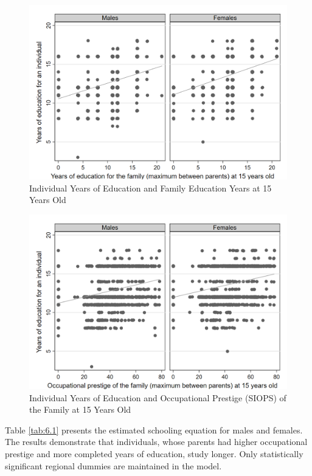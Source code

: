 \documentclass[alpha-refs]{wiley-article-01g}
\begin{document}
\begin{figure}[h!]
	\centering
	\includegraphics[width=\textwidth]{fam_edu_schooling.png}
	\caption{Individual Years of Education and Family Education Years at 15 Years Old}\label{fig:6.1}
\end{figure}

\begin{figure}[h!]
	\centering
	\includegraphics[width=\textwidth]{fam_prestige_schooling.png}
	\caption{Individual Years of Education and Occupational Prestige (SIOPS) of the Family at 15 Years Old}\label{fig:6.2}
\end{figure}

Table \ref{tab:6.1} presents the estimated schooling equation for males and 
females. The results demonstrate that individuals, whose parents had higher 
occupational prestige and more completed years of education, study longer. 
Only statistically significant regional dummies are maintained in the model.
\end{document}
